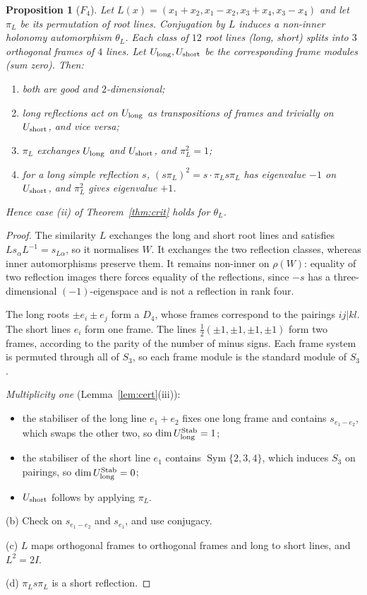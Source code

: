 \documentclass[11pt]{amsart}
\newtheorem{proposition}[theorem]{Proposition}
\theoremstyle{definition}
\newcommand{\Sym}{\operatorname{Sym}}
\begin{document}
\begin{proposition}[$F_4$]\label{prop:F4}
Let $L(x)=(x_1+x_2,x_1-x_2,x_3+x_4,x_3-x_4)$ and let $\pi_L$ be its permutation of root lines.
Conjugation by $L$ induces a non-inner holonomy automorphism $\theta_L$.
Each class of $12$ root lines (long, short) splits into $3$ orthogonal frames of $4$ lines. Let
$U_{\rm long},U_{\rm short}$ be the corresponding frame modules (sum zero). Then:
\begin{enumerate}[label=(\alph*)]
\item both are good and $2$-dimensional;
\item long reflections act on $U_{\rm long}$ as transpositions of frames and trivially on $U_{\rm short}$, and
vice versa;
\item $\pi_L$ exchanges $U_{\rm long}$ and $U_{\rm short}$, and $\pi_L^2=1$;
\item for a long simple reflection $s$, $(s\pi_L)^2=s\cdot\pi_Ls\pi_L$ has eigenvalue $-1$ on $U_{\rm short}$, and
$\pi_L^2$ gives eigenvalue $+1$.
\end{enumerate}
Hence case (ii) of Theorem~\ref{thm:crit} holds for $\theta_L$.
\end{proposition}

\begin{proof}
The similarity $L$ exchanges the long and short root lines and satisfies
$Ls_\alpha L^{-1}=s_{L\alpha}$, so it normalises $W$. It exchanges the two reflection classes,
whereas inner automorphisms preserve them. It remains non-inner on $\rho(W)$:
equality of two reflection images there forces equality of the reflections, since $-s$
has a three-dimensional $(-1)$-eigenspace and is not a reflection in rank four.

The long roots $\pm e_i\pm e_j$ form a $D_4$, whose frames correspond to the pairings $ij|kl$. The short lines
$e_i$ form one frame. The lines $\frac12(\pm1,\pm1,\pm1,\pm1)$ form two frames, according to the parity of the
number of minus signs. Each frame system is permuted through all of $S_3$, so each frame module is the standard
module of $S_3$.

\emph{Multiplicity one} (Lemma~\ref{lem:cert}(iii)):
\begin{itemize}
\item the stabiliser of the long line $e_1+e_2$ fixes one long frame and contains $s_{e_1-e_2}$, which swaps the
other two, so $\dim U_{\rm long}^{\rm Stab}=1$;
\item the stabiliser of the short line $e_1$ contains $\Sym\{2,3,4\}$, which induces $S_3$ on pairings, so
$\dim U_{\rm long}^{\rm Stab}=0$;
\item $U_{\rm short}$ follows by applying $\pi_L$.
\end{itemize}

(b) Check on $s_{e_1-e_2}$ and $s_{e_1}$, and use conjugacy.

(c) $L$ maps orthogonal frames to orthogonal frames and long to short lines, and $L^2=2I$.

(d) $\pi_Ls\pi_L$ is a short reflection.
\end{proof}
\end{document}
